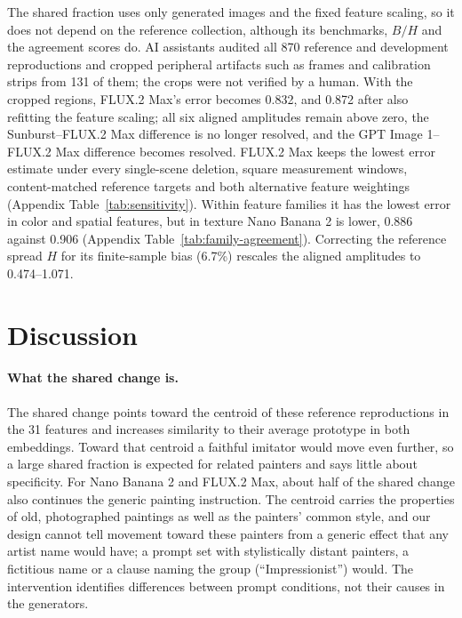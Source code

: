 \documentclass[10pt]{article}
\begin{document}
The shared fraction uses only generated images and the fixed feature scaling, so it does not depend
on the reference collection, although its benchmarks, $B/H$ and the agreement scores do. AI
assistants audited all 870 reference and development reproductions and cropped peripheral
artifacts such as frames and calibration strips from 131 of them; the crops were not verified by a
human. With the cropped regions, FLUX.2 Max's error becomes 0.832, and 0.872 after also refitting
the feature scaling; all six aligned amplitudes remain above zero, the Sunburst--FLUX.2 Max
difference is no longer resolved, and the GPT Image 1--FLUX.2 Max difference becomes resolved.
FLUX.2 Max keeps the lowest error estimate under every single-scene deletion, square measurement
windows, content-matched reference targets and both alternative feature weightings (Appendix
Table~\ref{tab:sensitivity}). Within feature families it has the lowest error in color and spatial
features, but in texture Nano Banana 2 is lower, 0.886 against 0.906 (Appendix
Table~\ref{tab:family-agreement}). Correcting the reference spread $H$ for its finite-sample bias
(6.7\%) rescales the aligned amplitudes to 0.474--1.071.

\section{Discussion}\label{sec:discussion}

\paragraph{What the shared change is.}
The shared change points toward the centroid of these reference reproductions in the 31 features
and increases similarity to their average prototype in both embeddings. Toward that centroid a
faithful imitator would move even further, so a large shared fraction is expected for related
painters and says little about specificity. For Nano Banana 2 and FLUX.2 Max, about half of the
shared change also continues the generic painting instruction. The centroid carries the properties
of old, photographed paintings as well as the painters' common style, and our design cannot tell
movement toward these painters from a generic effect that any artist name would have; a prompt set
with stylistically distant painters, a fictitious name or a clause naming the group
(``Impressionist'') would. The intervention identifies differences between prompt conditions, not
their causes in the generators.
\end{document}
